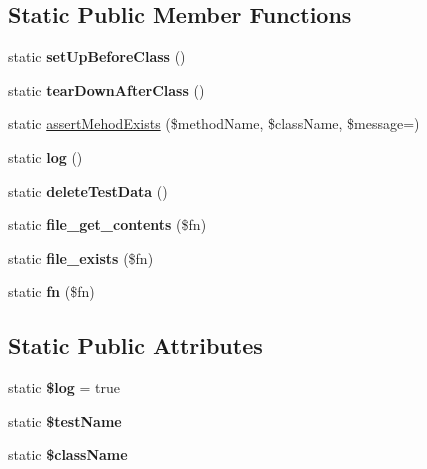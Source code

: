 \subsection*{Static Public Member Functions}
\begin{DoxyCompactItemize}
\item 
\mbox{\label{classPHPUnit__BaseClass_a60ae35ccac9ae2091ed0eb1b85308f23}} 
static {\bfseries set\+Up\+Before\+Class} ()
\item 
\mbox{\label{classPHPUnit__BaseClass_a4c461dd4b34ea4aa7bf220e93f2293f5}} 
static {\bfseries tear\+Down\+After\+Class} ()
\item 
static \mbox{\hyperlink{classPHPUnit__BaseClass_ac354b0666be4d66739d3f3217b6df14e}{assert\+Mehod\+Exists}} (\$method\+Name, \$class\+Name, \$message=\textquotesingle{}\textquotesingle{})
\item 
\mbox{\label{classPHPUnit__BaseClass_a4cde94b2b578e01ed069ee94ed2db4b3}} 
static {\bfseries log} ()
\item 
\mbox{\label{classPHPUnit__BaseClass_a476cd6dee898f9859220467708cdcacb}} 
static {\bfseries delete\+Test\+Data} ()
\item 
\mbox{\label{classPHPUnit__BaseClass_aa5283e3f35700a53d12ed76831bdcda7}} 
static {\bfseries file\+\_\+get\+\_\+contents} (\$fn)
\item 
\mbox{\label{classPHPUnit__BaseClass_abbad7ccd5c9c228b256e7e8c060799b4}} 
static {\bfseries file\+\_\+exists} (\$fn)
\item 
\mbox{\label{classPHPUnit__BaseClass_a77b1b37f89316db7b7dfc3119934e5cb}} 
static {\bfseries fn} (\$fn)
\end{DoxyCompactItemize}
\subsection*{Static Public Attributes}
\begin{DoxyCompactItemize}
\item 
\mbox{\label{classPHPUnit__BaseClass_a1b49dcd40f7eabcda116cd83e5524a03}} 
static {\bfseries \$log} = true
\item 
\mbox{\label{classPHPUnit__BaseClass_a67307510295c39bd1e18b0cb047078f7}} 
static {\bfseries \$test\+Name}
\item 
\mbox{\label{classPHPUnit__BaseClass_a6860a74c6a61d435ab8337184613c188}} 
static {\bfseries \$class\+Name}
\end{DoxyCompactItemize}


